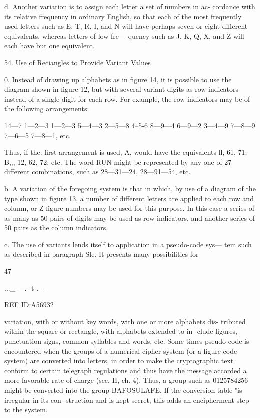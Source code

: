 {{d. Another variation is to assign each letter a set of numbers in ac-
cordance with its relative frequency in ordinary English, so that each of
the most frequently used letters such as E, T, R, I, and N will have
perhaps seven or eight different equivalents, whereas letters of low fre—
quency such as J, K, Q, X, and Z will each have but one equivalent.

54. Use of Reciangles to Provide Variant Values

0. Instead of drawing up alphabets as in ﬁgure 14, it is possible to use
the diagram shown in ﬁgure 12, but with several variant digits as row
indicators instead of a single digit for each row. For example, the row
indicators may be of the following arrangements:

14—7 1—2—3 1—2—3 5—4—3
2—5—8 4--5-6 8—9—4 6—9—2
3—4—9 7—8—9 7—6—5 7—8—1, etc.

Thus, if the. ﬁrst arrangement is used, A, would have the equivalents ll,
61, 71; B,,, 12, 62, 72; etc. The word RUN might be represented by
any one of 27 different combinations, such as 28—31—24, 28—91—54, etc.

b. A variation of the foregoing system is that in which, by use of a
diagram of the type shown in ﬁgure 13, a number of different letters are
applied to each row and column, or Z-ﬁgure numbers may be used for
this purpose. In this case a series of as many as 50 pairs of digits may be
used as row indicators, and another series of 50 pairs as the column
indicators.

c. The use of variants lends itself to application in a pseudo-code sys—
tem such as described in paragraph Sle. It presents many possibilities for

47

 

..._-—.- t-.- -

REF ID:A56932

variation, with or without key words, with one or more alphabets dis-
tributed within the square or rectangle, with alphabets extended to in-
clude ﬁgures, punctuation signs, common syllables and words, etc. Some
times pseudo-code is encountered when the groups of a numerical cipher
system (or a ﬁgure-code system) are converted into letters, in order to
make the cryptographic text conform to certain telegraph regulations
and thus have the message accorded a more favorable rate of charge (sec.
II, ch. 4). Thus, a group such as 0125784256 might be converted into the
group BAFOSULAFE. If the conversion table "is irregular in its con-
struction and is kept secret, this adds an encipherment step to the system.

}}

